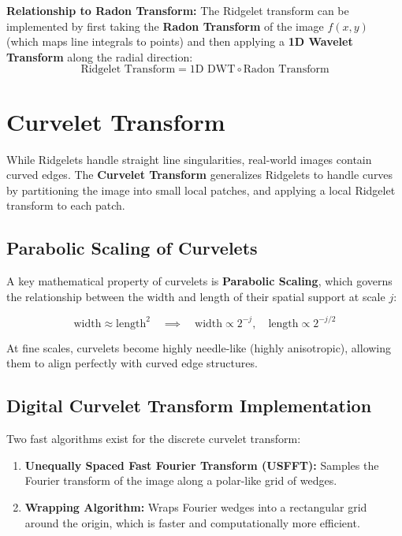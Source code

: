 \documentclass[12pt,a4paper]{article}
\begin{document}
\textbf{Relationship to Radon Transform:}
The Ridgelet transform can be implemented by first taking the \textbf{Radon Transform} of the image $f(x,y)$ (which maps line integrals to points) and then applying a \textbf{1D Wavelet Transform} along the radial direction:
$$\text{Ridgelet Transform} = \text{1D DWT} \circ \text{Radon Transform}$$

\section{Curvelet Transform}

While Ridgelets handle straight line singularities, real-world images contain curved edges. The \textbf{Curvelet Transform} generalizes Ridgelets to handle curves by partitioning the image into small local patches, and applying a local Ridgelet transform to each patch.

\subsection{Parabolic Scaling of Curvelets}
A key mathematical property of curvelets is \textbf{Parabolic Scaling}, which governs the relationship between the width and length of their spatial support at scale $j$:
\begin{tcolorbox}[formulabox, title={\textbf{Parabolic Scaling Law}}]
$$\text{width} \approx \text{length}^2 \quad \implies \quad \text{width} \propto 2^{-j}, \quad \text{length} \propto 2^{-j/2}$$
\end{tcolorbox}
At fine scales, curvelets become highly needle-like (highly anisotropic), allowing them to align perfectly with curved edge structures.

\subsection{Digital Curvelet Transform Implementation}
Two fast algorithms exist for the discrete curvelet transform:
\begin{enumerate}[leftmargin=*, itemsep=4pt]
  \item \textbf{Unequally Spaced Fast Fourier Transform (USFFT):} Samples the Fourier transform of the image along a polar-like grid of wedges.
  \item \textbf{Wrapping Algorithm:} Wraps Fourier wedges into a rectangular grid around the origin, which is faster and computationally more efficient.
\end{enumerate}
\end{document}
